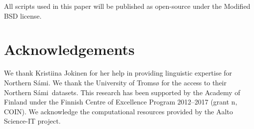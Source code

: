 \documentclass[b5paper]{article}
\newcommand{\note}[1]{{\textcolor{blue}{#1}}}
\newcommand{\ns}{Northern Sámi}
\begin{document}
All scripts used in this paper will be published as open-source under the Modified BSD license. 





\section{Acknowledgements} 
We thank Kristiina Jokinen for her help in providing linguistic expertise for \ns. We thank the University of Tromsø for the access to their \ns\ datasets.  This research has been supported by the Academy of Finland under the Finnish Centre of Excellence Program 2012--2017 (grant n, COIN).
We acknowledge the computational resources provided by the Aalto Science-IT project. 




 
\end{document}
